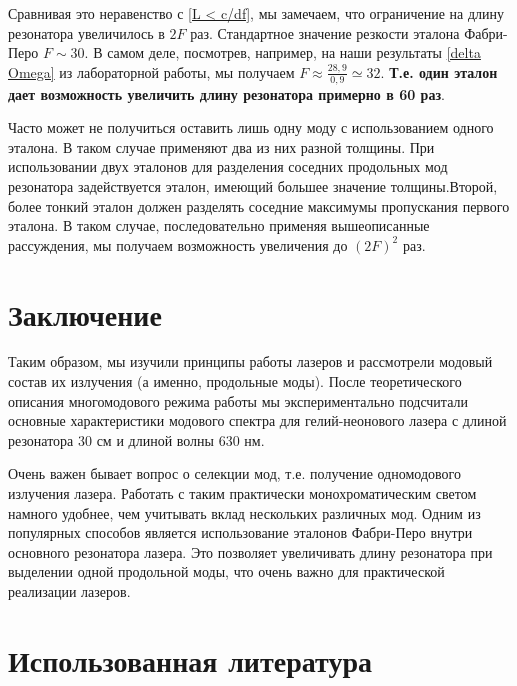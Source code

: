 \documentclass[12pt]{kiarticle}
\begin{document}
Сравнивая это неравенство с \eqref{L < c/df}, мы замечаем, что ограничение на длину резонатора увеличилось в $ 2F $ раз. Стандартное значение резкости эталона Фабри-Перо $ F \sim 30 $. В самом деле, посмотрев, например, на наши результаты \eqref{delta Omega} из лабораторной работы, мы получаем $ F \approx \frac{28,9}{0,9} \simeq 32 $. \textbf{Т.е. один эталон дает возможность увеличить длину резонатора примерно в 60 раз}. 

Часто может не получиться оставить лишь одну моду с использованием одного эталона. В таком случае применяют два из них разной толщины. При использовании двух эталонов для разделения соседних продольных мод резонатора задействуется эталон, имеющий большее значение толщины.Второй, более тонкий эталон должен разделять соседние максимумы пропускания первого эталона. В таком случае, последовательно применяя вышеописанные рассуждения, мы получаем возможность увеличения до $ (2F)^2 $ раз. 

\section{Заключение}

Таким образом, мы изучили принципы работы лазеров и рассмотрели модовый состав их излучения (а именно, продольные моды). После теоретического описания многомодового режима работы мы экспериментально подсчитали основные характеристики модового спектра для гелий-неонового лазера с длиной резонатора 30 см и длиной волны 630 нм. 

Очень важен бывает вопрос о селекции мод, т.е. получение одномодового излучения лазера. Работать с таким практически монохроматическим светом намного удобнее, чем учитывать вклад нескольких различных мод. 
Одним из популярных способов является использование эталонов Фабри-Перо внутри основного резонатора лазера. Это позволяет увеличивать длину резонатора при выделении одной продольной моды, что очень важно для практической реализации лазеров. 

\section*{Использованная литература}
\end{document}
